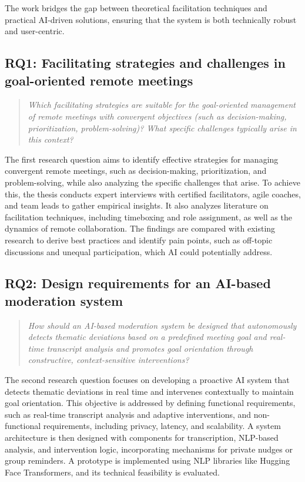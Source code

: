 The work bridges the gap between theoretical facilitation techniques and practical AI-driven solutions,
ensuring that the system is both technically robust and user-centric.
\subsection{RQ1: Facilitating strategies and challenges in goal-oriented remote meetings}
\begin{quote}
  \textit{Which facilitating strategies are suitable for the goal-oriented management of remote meetings with
    convergent objectives (such as decision-making, prioritization, problem-solving)? What specific challenges
  typically arise in this context?}
\end{quote}
The first research question aims to identify effective strategies for managing convergent remote meetings,
such as decision-making, prioritization, and problem-solving, while also analyzing the specific challenges
that arise. To achieve this, the thesis conducts expert interviews with certified facilitators, agile
coaches, and team leads to gather empirical insights. It also analyzes literature on facilitation techniques,
including timeboxing and role assignment, as well as the dynamics of remote collaboration. The findings are
compared with existing research to derive best practices and identify pain points, such as off-topic
discussions and unequal participation, which AI could potentially address.
\subsection{RQ2: Design requirements for an AI-based moderation system}
\begin{quote}
  \textit{How should an AI-based moderation system be designed that autonomously detects thematic deviations
    based on a predefined meeting goal and real-time transcript analysis and promotes goal orientation through
  constructive, context-sensitive interventions?}
\end{quote}
The second research question focuses on developing a proactive AI system that detects thematic deviations in
real time and intervenes contextually to maintain goal orientation. This objective is addressed by defining
functional requirements, such as real-time transcript analysis and adaptive interventions, and non-functional
requirements, including privacy, latency, and scalability. A system architecture is then designed with
components for transcription, NLP-based analysis, and intervention logic, incorporating mechanisms for
private nudges or group reminders. A prototype is implemented using NLP libraries like Hugging Face
Transformers, and its technical feasibility is evaluated.
